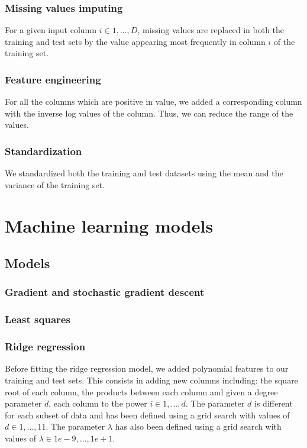 \documentclass[10pt,conference,compsocconf]{IEEEtran}
\begin{document}
\subsubsection{Missing values imputing}
For a given input column $i \in {1, ..., D}$, missing values are replaced in both the training and test sets by the value appearing most frequently in column $i$ of the training set.

\subsubsection{Feature engineering}
For all the columns which are positive in value, we added a corresponding column with the inverse log values of the column. Thus, we can reduce the range of the values.

\subsubsection{Standardization}
We standardized both the training and test datasets using the mean and the variance of the training set.

\section{Machine learning models}

\subsection{Models}
\subsubsection{Gradient and stochastic gradient descent}
\subsubsection{Least squares}
\subsubsection{Ridge regression}
Before fitting the ridge regression model, we added polynomial features to our training and test sets. This consists in adding new columns including: the square root of each column, the products between each column and given a degree parameter $d$, each column to the power $i \in {1, ..., d}$.
\linebreak
The parameter $d$ is different for each subset of data and has been defined using a grid search with values of $d \in {1, ..., 11}$.
\linebreak
The parameter $\lambda$ has also been defined using a grid search with values of $\lambda \in {1e-9, ..., 1e+1}$.
\end{document}
